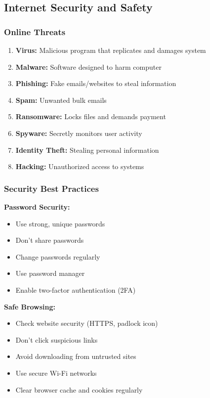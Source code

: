 \documentclass[12pt,a4paper]{article}
\begin{document}
\subsection{Internet Security and Safety}

\subsubsection{Online Threats}

\begin{enumerate}
    \item \textbf{Virus:} Malicious program that replicates and damages system
    \item \textbf{Malware:} Software designed to harm computer
    \item \textbf{Phishing:} Fake emails/websites to steal information
    \item \textbf{Spam:} Unwanted bulk emails
    \item \textbf{Ransomware:} Locks files and demands payment
    \item \textbf{Spyware:} Secretly monitors user activity
    \item \textbf{Identity Theft:} Stealing personal information
    \item \textbf{Hacking:} Unauthorized access to systems
\end{enumerate}

\subsubsection{Security Best Practices}

\textbf{Password Security:}
\begin{itemize}
    \item Use strong, unique passwords
    \item Don't share passwords
    \item Change passwords regularly
    \item Use password manager
    \item Enable two-factor authentication (2FA)
\end{itemize}

\textbf{Safe Browsing:}
\begin{itemize}
    \item Check website security (HTTPS, padlock icon)
    \item Don't click suspicious links
    \item Avoid downloading from untrusted sites
    \item Use secure Wi-Fi networks
    \item Clear browser cache and cookies regularly
\end{itemize}
\end{document}
